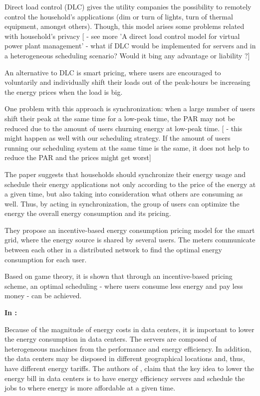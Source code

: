 Direct load control (DLC) gives the utility companies the possibility to
remotely control the household's applications (dim or turn of lights, turn of
thermal equipment, amongst others). Though, this model arises some problems
related with household's privacy
[ - see more  'A direct load control model for virtual power plant management'
  - what if DLC would be implemented for servers and in a heterogeneous
    scheduling scenario? Would it bing any advantage or liability ?]

An alternative to DLC is smart pricing, where users are encouraged to
voluntarily and individually shift their loads out of the peak-hours be
increasing the energy prices when the load is big.

One problem with this approach is synchronization: when a large number of users
shift their peak at the same time for a low-peak time, the PAR may not be
reduced due to the amount of users churning energy at low-peak time.
[ - this might happen as well with our scheduling strategy. If the amount of
users running our scheduling system at the same time is the same, it does not
help to reduce the PAR and the prices might get worst]

The paper suggests that households should synchronize their energy usage and
schedule their energy applications not only according to the price of the energy
at a given time, but also taking into consideration what others are consuming as
well. Thus, by acting in synchronization, the group of users can optimize the
energy the overall energy consumption and its pricing. 

They propose an incentive-based energy consumption pricing model for the smart
grid, where the energy source is shared by several users. The meters communicate
between each other in a distributed network to find the optimal energy
consumption for each user.

Based on game theory, it is shown that through an incentive-based pricing
scheme, an optimal scheduling - where users consume less energy and pay less
money - can be achieved.

\textbf{In \cite{EFF_JOB_SCHEDULING}:}

Because of the magnitude of energy costs in data centers, it is important to
lower the energy consumption in data centers. The servers are composed of
heterogeneous machines from the performance and energy efficiency. In addition,
the data centers may be disposed in different geographical locations and, thus,
have different energy tariffs. The authors of \cite{EFF_JOB_SCHEDULING}, claim that
the key idea to lower the energy bill in data centers is to have energy
efficiency servers and schedule the jobs to where energy is more affordable at a
given time.

